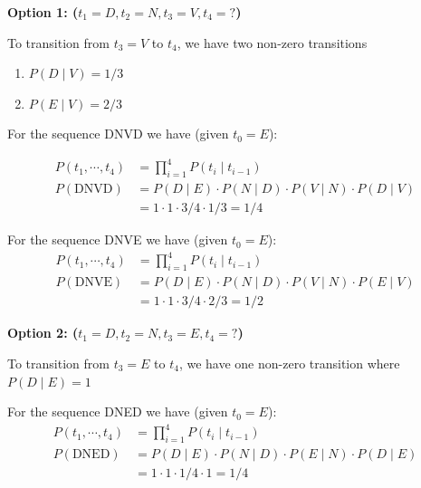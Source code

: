 
\textbf{Option 1: ($t_1=D, t_2 = N, t_3 = V, t_4 = ?$)}

To transition from $t_3 = V$ to $t_4$, we have two non-zero transitions
\begin{enumerate}
    \item $P(D \mid V) = 1/3$
    \item $P(E \mid V) = 2/3$
\end{enumerate}

For the sequence DNVD we have (given $t_0 = E$):

\begin{align*}
P(t_1, \cdots, t_4) &= \prod_{i=1}^{4} P(t_i \mid t_{i-1}) \\
P(\text{DNVD}) &= P(D \mid E) \cdot P(N \mid D) \cdot P(V \mid N) \cdot P(D \mid V) \\ 
&= 1 \cdot 1 \cdot 3/4 \cdot 1/3 = 1/4
\end{align*}

For the sequence DNVE we have (given $t_0 = E$):
\begin{align*}
P(t_1, \cdots, t_4) &= \prod_{i=1}^{4} P(t_i \mid t_{i-1}) \\
P(\text{DNVE}) &= P(D \mid E) \cdot P(N \mid D) \cdot P(V \mid N) \cdot P(E \mid V) \\ 
&= 1 \cdot 1 \cdot 3/4 \cdot 2/3 = 1/2
\end{align*}


\textbf{Option 2: ($t_1=D, t_2 = N, t_3 = E, t_4 = ?$)}

To transition from $t_3 = E$ to $t_4$, we have one non-zero transition where $P(D \mid E) = 1$

For the sequence DNED we have (given $t_0 = E$):
\begin{align*}
P(t_1, \cdots, t_4) &= \prod_{i=1}^{4} P(t_i \mid t_{i-1}) \\
P(\text{DNED}) &= P(D \mid E) \cdot P(N \mid D) \cdot P(E \mid N) \cdot P(D \mid E) \\ 
&= 1 \cdot 1 \cdot 1/4 \cdot 1 = 1/4
\end{align*}

